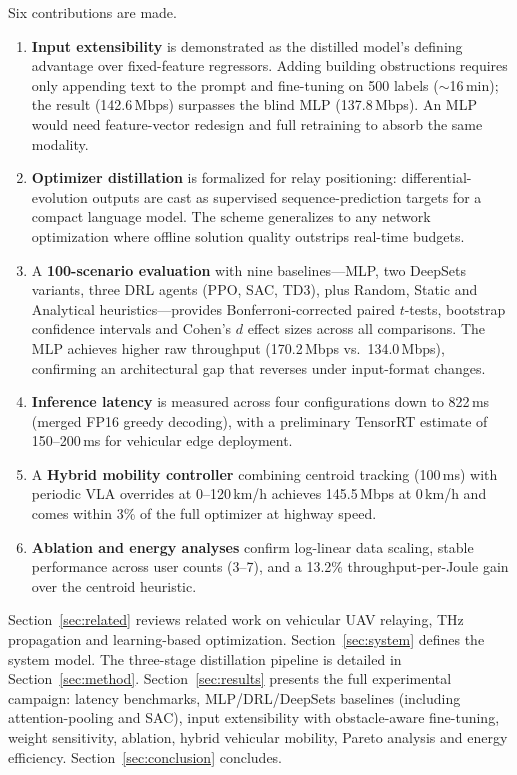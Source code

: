 \documentclass[journal]{IEEEtran}
\begin{document}
Six contributions are made.
\begin{enumerate}
    \item \textbf{Input extensibility} is demonstrated as the distilled model's defining advantage over fixed-feature regressors. Adding building obstructions requires only appending text to the prompt and fine-tuning on 500 labels (${\sim}$16\,min); the result (142.6\,Mbps) surpasses the blind MLP (137.8\,Mbps). An MLP would need feature-vector redesign and full retraining to absorb the same modality.

    \item \textbf{Optimizer distillation} is formalized for relay positioning: differential-evolution outputs are cast as supervised sequence-prediction targets for a compact language model. The scheme generalizes to any network optimization where offline solution quality outstrips real-time budgets.

    \item A \textbf{100-scenario evaluation} with nine baselines---MLP, two DeepSets variants, three DRL agents (PPO, SAC, TD3), plus Random, Static and Analytical heuristics---provides Bonferroni-corrected paired $t$-tests, bootstrap confidence intervals and Cohen's $d$ effect sizes across all comparisons. The MLP achieves higher raw throughput (170.2\,Mbps vs.\ 134.0\,Mbps), confirming an architectural gap that reverses under input-format changes.

    \item \textbf{Inference latency} is measured across four configurations down to 822\,ms (merged FP16 greedy decoding), with a preliminary TensorRT estimate of 150--200\,ms for vehicular edge deployment.

    \item A \textbf{Hybrid mobility controller} combining centroid tracking (100\,ms) with periodic VLA overrides at 0--120\,km/h achieves 145.5\,Mbps at 0\,km/h and comes within 3\% of the full optimizer at highway speed.

    \item \textbf{Ablation and energy analyses} confirm log-linear data scaling, stable performance across user counts (3--7), and a 13.2\% throughput-per-Joule gain over the centroid heuristic.
\end{enumerate}

Section~\ref{sec:related} reviews related work on vehicular UAV relaying, THz propagation and learning-based optimization. Section~\ref{sec:system} defines the system model. The three-stage distillation pipeline is detailed in Section~\ref{sec:method}. Section~\ref{sec:results} presents the full experimental campaign: latency benchmarks, MLP/DRL/DeepSets baselines (including attention-pooling and SAC), input extensibility with obstacle-aware fine-tuning, weight sensitivity, ablation, hybrid vehicular mobility, Pareto analysis and energy efficiency. Section~\ref{sec:conclusion} concludes.
\end{document}
